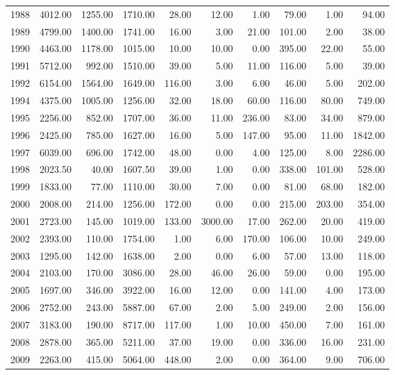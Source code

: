 \begin{sidewaystable}
{\begin{tabular}{rrrrrrrrrr}
  1988 & 4012.00 & 1255.00 & 1710.00 & 28.00 & 12.00 & 1.00 & 79.00 & 1.00 & 94.00 \\ 
  1989 & 4799.00 & 1400.00 & 1741.00 & 16.00 & 3.00 & 21.00 & 101.00 & 2.00 & 38.00 \\ 
  1990 & 4463.00 & 1178.00 & 1015.00 & 10.00 & 10.00 & 0.00 & 395.00 & 22.00 & 55.00 \\ 
  1991 & 5712.00 & 992.00 & 1510.00 & 39.00 & 5.00 & 11.00 & 116.00 & 5.00 & 39.00 \\ 
  1992 & 6154.00 & 1564.00 & 1649.00 & 116.00 & 3.00 & 6.00 & 46.00 & 5.00 & 202.00 \\ 
  1994 & 4375.00 & 1005.00 & 1256.00 & 32.00 & 18.00 & 60.00 & 116.00 & 80.00 & 749.00 \\ 
  1995 & 2256.00 & 852.00 & 1707.00 & 36.00 & 11.00 & 236.00 & 83.00 & 34.00 & 879.00 \\ 
  1996 & 2425.00 & 785.00 & 1627.00 & 16.00 & 5.00 & 147.00 & 95.00 & 11.00 & 1842.00 \\ 
  1997 & 6039.00 & 696.00 & 1742.00 & 48.00 & 0.00 & 4.00 & 125.00 & 8.00 & 2286.00 \\ 
  1998 & 2023.50 & 40.00 & 1607.50 & 39.00 & 1.00 & 0.00 & 338.00 & 101.00 & 528.00 \\ 
  1999 & 1833.00 & 77.00 & 1110.00 & 30.00 & 7.00 & 0.00 & 81.00 & 68.00 & 182.00 \\ 
  2000 & 2008.00 & 214.00 & 1256.00 & 172.00 & 0.00 & 0.00 & 215.00 & 203.00 & 354.00 \\ 
  2001 & 2723.00 & 145.00 & 1019.00 & 133.00 & 3000.00 & 17.00 & 262.00 & 20.00 & 419.00 \\ 
  2002 & 2393.00 & 110.00 & 1754.00 & 1.00 & 6.00 & 170.00 & 106.00 & 10.00 & 249.00 \\ 
  2003 & 1295.00 & 142.00 & 1638.00 & 2.00 & 0.00 & 6.00 & 57.00 & 13.00 & 118.00 \\ 
  2004 & 2103.00 & 170.00 & 3086.00 & 28.00 & 46.00 & 26.00 & 59.00 & 0.00 & 195.00 \\ 
  2005 & 1697.00 & 346.00 & 3922.00 & 16.00 & 12.00 & 0.00 & 141.00 & 4.00 & 173.00 \\ 
  2006 & 2752.00 & 243.00 & 5887.00 & 67.00 & 2.00 & 5.00 & 249.00 & 2.00 & 156.00 \\ 
  2007 & 3183.00 & 190.00 & 8717.00 & 117.00 & 1.00 & 10.00 & 450.00 & 7.00 & 161.00 \\ 
  2008 & 2878.00 & 365.00 & 5211.00 & 37.00 & 19.00 & 0.00 & 336.00 & 16.00 & 231.00 \\ 
  2009 & 2263.00 & 415.00 & 5064.00 & 448.00 & 2.00 & 0.00 & 364.00 & 9.00 & 706.00 \\ 

\end{tabular}}
\end{sidewaystable}
